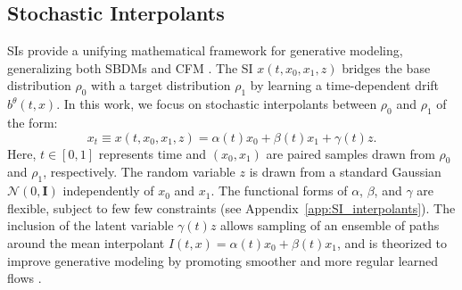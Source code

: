 \subsection{Stochastic Interpolants}

SIs provide a unifying mathematical framework for generative modeling, generalizing both SBDMs and CFM \citep{albergo_stochastic_2023}. 
The SI $x(t, x_0, x_1, z)$ bridges the base distribution $\rho_0$ with a target distribution $\rho_1$ by learning a time-dependent drift $b^\theta(t, x)$.
In this work, we focus on stochastic interpolants between $\rho_0$ and $\rho_1$ of the form:
\begin{equation}
    x_t \equiv x(t, x_0, x_1, z) = \alpha(t) x_0 + \beta(t) x_1 + \gamma(t) z.
\label{eq:linear_si}
\end{equation}
Here, $t\in[0,1]$ represents time and $(x_0, x_1)$ are paired samples drawn from $\rho_0$ and $\rho_1$, respectively.
The random variable $z$  is drawn from a standard Gaussian $\mathcal{N}(0, \bm{I})$ independently of $x_0$ and $x_1$. The functional forms of $\alpha$, $\beta$, and $\gamma$ are flexible, subject to few few constraints (see Appendix~\ref{app:SI_interpolants}). The inclusion of the latent variable $\gamma(t)z$ allows sampling of an ensemble of paths around the mean interpolant $I(t, x) = \alpha(t) x_0 + \beta(t) x_1$, and is theorized to improve generative modeling by promoting smoother and more regular learned flows \citep{albergo_stochastic_2023}.

